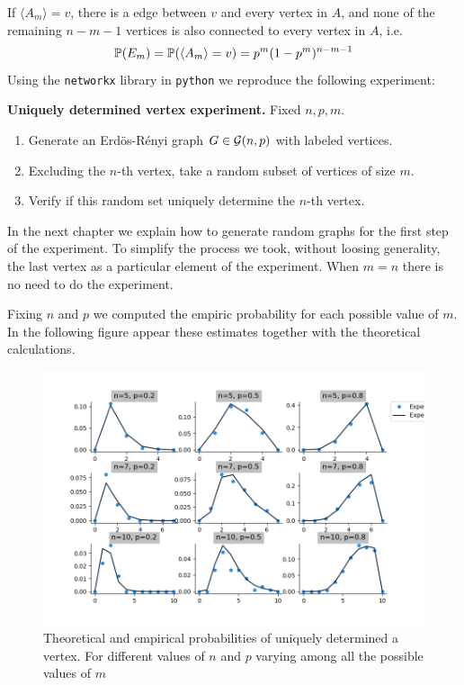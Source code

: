If $\langle A_{m} \rangle = v$, there is a edge between $v$ and every vertex in $A$, and none of the remaining $n-m-1$ vertices is also connected to every vertex in $A$, i.e.
$$\P (E_m) = \P(\langle A_{m}\rangle = v) = p^{m}(1-p^{m})^{n-m-1}$$
Using the \texttt{networkx} library in \texttt{python} we reproduce the following experiment:

\begin{cajita}
\textbf{Uniquely determined vertex experiment.} Fixed $n,p,m$.
\begin{enumerate}
\item Generate an Erdös-Rényi graph $G\in \G(n,p)$ with labeled vertices.
\item Excluding the $n$-th vertex, take a random subset of vertices of size $m$.
\item Verify if this random set uniquely determine the $n$-th vertex.
\end{enumerate}
\end{cajita}

In the next chapter we explain how to generate random graphs for the first step of the experiment. To simplify the process we took, without loosing generality, the last vertex as a particular element of the experiment. When $m=n$ there is no need to do the experiment.

Fixing $n$ and $p$ we computed the empiric probability for each possible value of $m$. In the following figure appear these estimates together with the theoretical calculations.

\begin{figure}[h!]
	\centering
	\includegraphics[scale=0.55]{Python/Figures/Uniquely-determinated-fixed-vertex.png}
	\caption{Theoretical and empirical probabilities of uniquely determined a vertex. For different values of $n$ and $p$ varying among all the possible values of $m$}
\end{figure}

